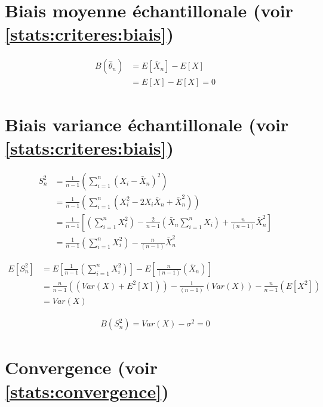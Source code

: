 \section{Biais moyenne échantillonale (voir \ref{stats:criteres:biais})}\label{biais-moyenne-echantillonale-voir-refstatscriteresbiais}

\label{preuves:biais:xn} 

\begin{align*}
B(\hat{\theta}_n)& =E[\bar{X}_n]-E[X]\\
& =E[X]-E[X]=0
\end{align*}


\section{Biais variance échantillonale (voir \ref{stats:criteres:biais})}\label{biais-variance-echantillonale-voir-refstatscriteresbiais}

\label{preuves:biais:sn} 

\begin{align*}
S_n^2& =\frac{1}{n-1}\left(\sum_{i=1}^n {(X_i-\bar{X}_n)}^2\right)\\
& =\frac{1}{n-1}\left(\sum_{i=1}^n (X_i^2-2X_i\bar{X}_n+\bar{X}_n^2)\right)\\
& =\frac{1}{n-1}\left[\left(\sum_{i=1}^n X_i^2\right)  -\frac{2}{n-1}\left(\bar{X}_n\sum_{i=1}^n X_i\right) +\frac{n}{(n-1)}\bar{X}_n^2\right]\\
& =\frac{1}{n-1}\left(\sum_{i=1}^n X_i^2\right) - \frac{n}{(n-1)}\bar{X}_n^2
\end{align*}

\begin{align*}
E\left[S_n^2\right]& =E\left[\frac{1}{n-1}\left(\sum_{i=1}^n X_i^2\right)\right]-E\left[\frac{n}{(n-1)}(\bar{X}_n)\right]\\
& =\frac{n}{n-1}((Var(X)+E^2[X])) - \frac{1}{(n-1)}(Var(X))-\frac{n}{n-1}(E[X^2])\\
& =Var(X)
\end{align*}

\begin{gather*}
B(S^2_n)= Var(X)-\sigma^2 = 0
\end{gather*}


\section{Convergence (voir \ref{stats:convergence})}\label{convergence-voir-refstatsconvergence}

